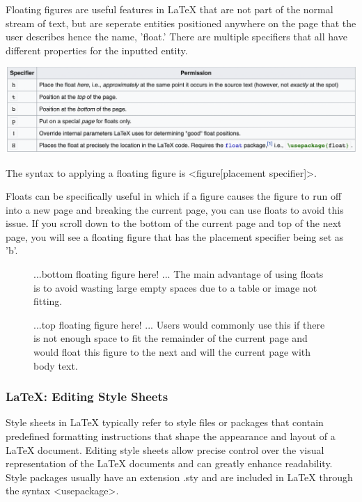 \documentclass[a4paper, 11pt]{report}
\begin{document}
Floating figures are useful features in LaTeX that are not part of the normal stream of text, but are seperate entities positioned anywhere on the page that the user describes hence the name, 'float.' There are multiple specifiers that all have different properties for the inputted entity.

\includegraphics[width=\textwidth]{float_table}

The syntax to applying a floating figure is <{figure}[placement specifier]>.

Floats can be specifically useful in which if a figure causes the figure to run off into a new page and breaking the current page,  you can use floats to avoid this issue.  If you scroll down to the bottom of the current page and top of the next page,  you will see a floating figure that has the placement specifier being set as 'b'.

\begin{figure}[b]
...bottom floating figure here! ...
The main advantage of using floats is to avoid wasting large empty spaces due to a table or image not fitting.
\end{figure}

\begin{figure}[t ]
...top floating figure here! ...
Users would commonly use this if there is not enough space to fit the remainder of the current page and would float this figure to the next and will the current page with body text.
\end{figure}

\subsubsection{LaTeX: Editing Style Sheets \cite{stylesheets}}
\pagestyle{fancy}
Style sheets in LaTeX typically refer to style files or packages that contain predefined formatting instructions that shape the appearance and layout of a LaTeX document.  Editing style sheets allow precise control over the visual representation of the LaTeX documents and can greatly enhance readability.  Style packages usually have an extension .sty and are included in LaTeX through the syntax <usepackage>.
\end{document}
